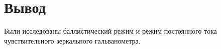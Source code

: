 \section{Вывод}
Были исследованы баллистический режим и режим постоянного тока чувствительного зеркального гальванометра.
